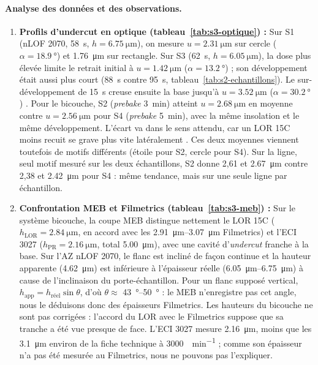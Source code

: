 \paragraph{Analyse des données et des observations.}
\begin{enumerate}
  \item \textbf{Profils d'undercut en optique (tableau~\ref{tab:s3-optique}) :} Sur S1 (nLOF 2070, \qty{58}{\second}, $h = \qty{6,75}{\micro\metre}$), on mesure $u = \qty{2,31}{\micro\metre}$ sur cercle ($\alpha = \qty{18,9}{\degree}$) et \qty{1,76}{\micro\metre} sur rectangle. Sur S3 (\qty{62}{\second}, $h = \qty{6,05}{\micro\metre}$), la dose plus élevée limite le retrait initial à $u = \qty{1,42}{\micro\metre}$ ($\alpha = \qty{13,2}{\degree}$) ; son développement était aussi plus court (\qty{88}{\second} contre \qty{95}{\second}, tableau~\ref{tab:s2-echantillons}). Le sur-développement de \qty{15}{\second} creuse ensuite la base jusqu'à $u = \qty{3,52}{\micro\metre}$ ($\alpha = \qty{30,2}{\degree}$) \cite{tdsnlof}. Pour le bicouche, S2 (\emph{prebake} \qty{3}{\minute}) atteint $u = \qty{2,68}{\micro\metre}$ en moyenne contre $u = \qty{2,56}{\micro\metre}$ pour S4 (\emph{prebake} \qty{5}{\minute}), avec la même insolation et le même développement. L'écart va dans le sens attendu, car un LOR 15C moins recuit se grave plus vite latéralement \cite{lor}. Ces deux moyennes viennent toutefois de motifs différents (étoile pour S2, cercle pour S4). Sur la ligne, seul motif mesuré sur les deux échantillons, S2 donne 2,61 et \qty{2,67}{\micro\metre} contre 2,38 et \qty{2,42}{\micro\metre} pour S4 : même tendance, mais sur une seule ligne par échantillon.
  \item \textbf{Confrontation MEB et Filmetrics (tableau~\ref{tab:s3-meb}) :} Sur le système bicouche, la coupe MEB distingue nettement le LOR 15C ($h_{\text{LOR}} = \qty{2,84}{\micro\metre}$, en accord avec les \qtyrange{2,91}{3,07}{\micro\metre} Filmetrics) et l'ECI 3027 ($h_{\text{PR}} = \qty{2,16}{\micro\metre}$, total \qty{5,00}{\micro\metre}), avec une cavité d'\emph{undercut} franche à la base. Sur l'AZ nLOF 2070, le flanc est incliné de façon continue et la hauteur apparente (\qty{4,62}{\micro\metre}) est inférieure à l'épaisseur réelle (\qtyrange{6,05}{6,75}{\micro\metre}) à cause de l'inclinaison du porte-échantillon. Pour un flanc supposé vertical, $h_{\text{app}} = h_{\text{réel}}\sin\theta$, d'où $\theta \approx$ \qtyrange{43}{50}{\degree} : le MEB n'enregistre pas cet angle, nous le déduisons donc des épaisseurs Filmetrics. Les hauteurs du bicouche ne sont pas corrigées : l'accord du LOR avec le Filmetrics suppose que sa tranche a été vue presque de face. L'ECI 3027 mesure \qty{2,16}{\micro\metre}, moins que les \qty{3,1}{\micro\metre} environ de la fiche technique à \qty{3000}{\tour\per\minute} \cite{tdseci} ; comme son épaisseur n'a pas été mesurée au Filmetrics, nous ne pouvons pas l'expliquer.

\end{enumerate}
